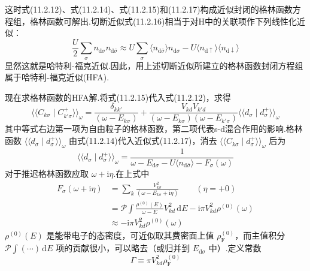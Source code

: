 这时式(11.2.12)、式(11.2.14)、式(11.2.15)和(11.2.17)构成近似封闭的格林函数方程组，格林函数可解出.切断近似式(11.2.16)相当于对H中的关联项作下列线性化近似：
\begin{equation}
  \frac{U}{2}\sum_{\sigma}n_{\mathrm{d}\sigma}n_{\mathrm{d}\bar{\sigma}}
  \approx U\sum_{\sigma}\langle n_{\mathrm{d}\bar{\sigma}}\rangle n_{\mathrm{d}\sigma}
  -U\langle n_{\mathrm{d}\uparrow}\rangle\langle n_{\mathrm{d}\downarrow}\rangle
\end{equation}
显然这就是哈特利-福克近似.因此，用上述切断近似所建立的格林函数封闭方程组属于哈特利-福克近似(HFA).

现在求格林函数的HFA解.将式(11.2.15)代入式(11.2.12)，求得
\begin{equation}
  \langle\langle C_{k\sigma}\mid C^{+}_{k'\sigma}\rangle\rangle_{\omega}
  =\frac{\delta_{kk'}}{(\omega-E_{k\sigma})}
  +\frac{V_{kd}V_{k'd}}{(\omega-E_{k\sigma})(\omega-E_{k'\sigma})}
  \langle\langle d_{\sigma}\mid d^{+}_{\sigma}\rangle\rangle_{\omega}
\end{equation}
其中等式右边第一项为自由粒子的格林函数，第二项代表s-d混合作用的影响.格林函数 $\langle\langle d_{\sigma}\mid d^{+}_{\sigma}\rangle\rangle_{\omega}$ 由式(11.2.14)代入近似式(11.2.17)，消去 $\langle\langle C_{k\sigma}\mid d^{+}_{\sigma}\rangle\rangle_{\omega}$ 后为
\begin{equation}
  \langle\langle d_{\sigma}\mid d^{+}_{\sigma}\rangle\rangle_{\omega}
  =\frac{1}{\omega-E_{\mathrm{d}\sigma}
  -U\langle n_{\mathrm{d}\bar{\sigma}}\rangle-F_{\sigma}(\omega)}
\end{equation}
对于推迟格林函数应取 $\omega+\mathrm{i}\eta$.在上式中
\begin{equation}
\begin{aligned}
  F_{\sigma}(\omega+\mathrm{i}\eta)
  &=\sum_{k}\frac{V^{2}_{k\sigma}}{(\omega-E_{k\sigma}+\mathrm{i}\eta)}
  \qquad(\eta=+0)\\
  &=\mathscr{P}\int\frac{\rho^{(0)}(E)}{\omega-E}V^{2}_{kd}\,\mathrm{d}E
  -\mathrm{i}\pi V^{2}_{kd}\rho^{(0)}(\omega)\\
  &\approx-\mathrm{i}\pi V^{2}_{kd}\rho^{(0)}(\omega)
\end{aligned}
\end{equation}
$\rho^{(0)}(E)$ 是能带电子的态密度，可近似取其费密面上值 $\rho^{(0)}_{\mathrm{F}}$，而主值积分 $\mathscr{P}\int(\cdots)\,\mathrm{d}E$ 项的贡献很小，可以略去（或归并到 $E_{\mathrm{d}\sigma}$ 中）.定义常数
\begin{equation}
  \Gamma\equiv\pi V^{2}_{kd}\rho^{(0)}_{\mathrm{F}}
\end{equation}
